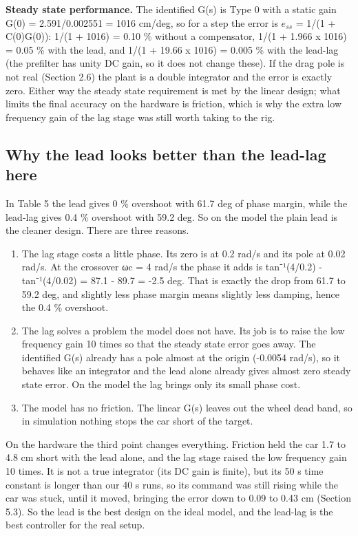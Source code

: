 \documentclass[11pt,a4paper]{article}
\providecommand{\tightlist}{\setlength{\itemsep}{0pt}\setlength{\parskip}{0pt}}
\begin{document}
\textbf{Steady state performance.} The identified G(s) is Type 0 with a static gain G(0) = 2.591/0.002551 = 1016 cm/deg, so for a step the error is $e_{ss}$ = 1/(1 + C(0)G(0)): 1/(1 + 1016) = 0.10 \% without a compensator, 1/(1 + 1.966 x 1016) = 0.05 \% with the lead, and 1/(1 + 19.66 x 1016) = 0.005 \% with the lead-lag (the prefilter has unity DC gain, so it does not change these). If the drag pole is not real (Section 2.6) the plant is a double integrator and the error is exactly zero. Either way the steady state requirement is met by the linear design; what limits the final accuracy on the hardware is friction, which is why the extra low frequency gain of the lag stage was still worth taking to the rig.

\hypertarget{why-the-lead-looks-better-than-the-lead-lag-here}{%
\subsection{Why the lead looks better than the lead-lag
here}\label{why-the-lead-looks-better-than-the-lead-lag-here}}

In Table 5 the lead gives 0 \% overshoot with 61.7 deg of phase margin,
while the lead-lag gives 0.4 \% overshoot with 59.2 deg. So on the model
the plain lead is the cleaner design. There are three reasons.

\begin{enumerate}
\def\labelenumi{\arabic{enumi}.}
\tightlist
\item
  The lag stage costs a little phase. Its zero is at 0.2 rad/s and its
  pole at 0.02 rad/s. At the crossover ωc = 4 rad/s the phase it adds is
  tan⁻¹(4/0.2) - tan⁻¹(4/0.02) = 87.1 - 89.7 = -2.5 deg. That is exactly
  the drop from 61.7 to 59.2 deg, and slightly less phase margin means
  slightly less damping, hence the 0.4 \% overshoot.
\item
  The lag solves a problem the model does not have. Its job is to raise
  the low frequency gain 10 times so that the steady state error goes
  away. The identified G(s) already has a pole almost at the origin
  (-0.0054 rad/s), so it behaves like an integrator and the lead alone
  already gives almost zero steady state error. On the model the lag
  brings only its small phase cost.
\item
  The model has no friction. The linear G(s) leaves out the wheel dead
  band, so in simulation nothing stops the car short of the target.
\end{enumerate}

On the hardware the third point changes everything. Friction held the
car 1.7 to 4.8 cm short with the lead alone, and the lag stage raised the low frequency gain 10 times. It is not a true integrator (its DC gain is finite), but its 50 s time constant is longer than our 40 s runs, so its command was still rising while the car was stuck, until it moved,
bringing the error down to 0.09 to 0.43 cm (Section 5.3). So the lead is
the best design on the ideal model, and the lead-lag is the best
controller for the real setup.
\end{document}
